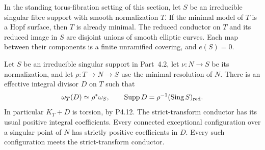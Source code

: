 
\begin{proposition}[P4.24]\hypertarget{tag-02WW}{}\label{night:P4.24}\label{stmt:P4.24}


In the standing torus-fibration setting of this section, let $S$ be an irreducible
singular fibre support with smooth normalization $T$.
If the minimal model of $T$ is a Hopf surface, then
$T$ is already minimal. The reduced conductor on $T$
and its reduced image in $S$ are disjoint unions of
smooth elliptic curves. Each map between their
components is a finite unramified covering, and
$e(S)=0$.
\end{proposition}

\begin{proposition}[P4R.6]\hypertarget{tag-02YI}{}\label{night:P4R.6}\label{stmt:P4R.6}


Let $S$ be an irreducible singular support in
Part~4.2, let $\nu:N\to S$ be its normalization,
and let $\rho:T\to N\to S$ use the minimal
resolution of $N$. There is an effective integral
divisor $D$ on $T$ such that
\[
 \omega_T(D)\simeq\rho^*\omega_S,
 \qquad \operatorname{Supp}D
       =\rho^{-1}(\operatorname{Sing}S)_{\rm red}.
\]
In particular $K_T+D$ is torsion, by P4.12.
The strict-transform conductor has its usual
positive integral coefficients. Every connected
exceptional configuration over a singular point
of $N$ has strictly positive coefficients in $D$.
Every such configuration meets the strict-transform
conductor.
\end{proposition}

